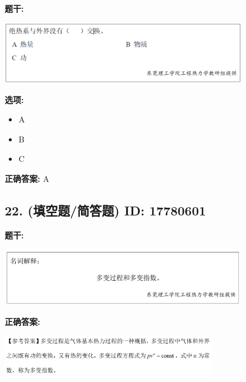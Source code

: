 \documentclass[12pt]{article}
\begin{document}
\textbf{题干:}


\begin{center}\includegraphics[width=0.8\textwidth, height=0.25\textheight, keepaspectratio]{question_21_17780574/title_img_1.png}\end{center}

\textbf{选项:}
\begin{itemize}[leftmargin=*]
  \item A

  \item B

  \item C

\end{itemize}

\textbf{正确答案:}
A

\vspace{0.5em}\hrulefill\vspace{1em}

\subsection*{22. (填空题/简答题) \small ID: 17780601}

\textbf{题干:}


\begin{center}\includegraphics[width=0.8\textwidth, height=0.25\textheight, keepaspectratio]{question_22_17780601/title_img_1.png}\end{center}

\textbf{正确答案:}

\begin{center}\includegraphics[width=0.7\textwidth, height=0.2\textheight, keepaspectratio]{question_22_17780601/correct_answer_1_img_1.png}\end{center}
\end{document}
